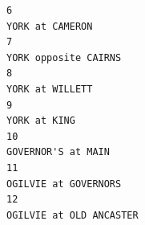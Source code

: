 \documentclass[
11pt, %
oneside, %
english, %
singlespacing, %
]{macthesis} %
\begin{document}
\begin{verbatim}
6                                                                                                                                                                                                                                                                                                                                                                                                                 YORK at CAMERON
7                                                                                                                                                                                                                                                                                                                                                                                                            YORK opposite CAIRNS
8                                                                                                                                                                                                                                                                                                                                                                                                                 YORK at WILLETT
9                                                                                                                                                                                                                                                                                                                                                                                                                    YORK at KING
10                                                                                                                                                                                                                                                                                                                                                                                                             GOVERNOR'S at MAIN
11                                                                                                                                                                                                                                                                                                                                                                                                           OGILVIE at GOVERNORS
12                                                                                                                                                                                                                                                                                                                                                                                                        OGILVIE at OLD ANCASTER

\end{verbatim}
\end{document}
